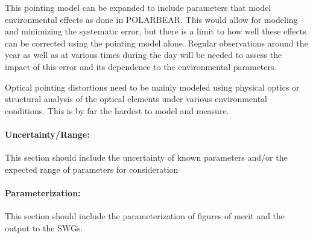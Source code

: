 This pointing model can be expanded to include parameters that model environmental effects as done in POLARBEAR. This would allow for modeling and minimizing the systematic error, but there is a limit to how well these effects can be corrected using the pointing model alone. Regular observations around the year as well as at various times during the day will be needed to assess the impact of this error and its dependence to the environmental parameters.

Optical pointing distortions need to be mainly modeled using physical optics or structural analysis of the optical elements under various environmental conditions. This is by far the hardest to model and measure.

\paragraph{Uncertainty/Range:}
This section should include the uncertainty of
known parameters and/or the expected range of parameters for consideration

\paragraph{Parameterization:}
This section should include the parameterization of figures of
merit and the output to the SWGs.
